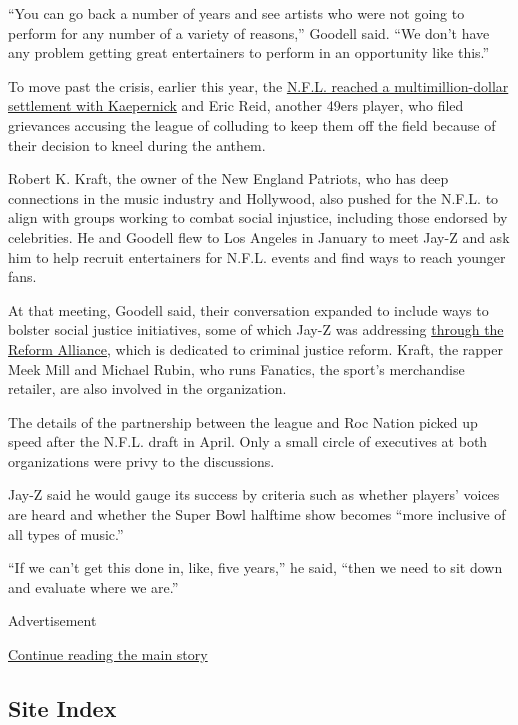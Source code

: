 ``You can go back a number of years and see artists who were not going
to perform for any number of a variety of reasons,'' Goodell said. ``We
don't have any problem getting great entertainers to perform in an
opportunity like this.''

To move past the crisis, earlier this year, the
\href{https://www.nytimes3xbfgragh.onion/2019/02/15/sports/nfl-colin-kaepernick.html}{N.F.L.
reached a multimillion-dollar settlement with Kaepernick} and Eric Reid,
another 49ers player, who filed grievances accusing the league of
colluding to keep them off the field because of their decision to kneel
during the anthem.

Robert K. Kraft, the owner of the New England Patriots, who has deep
connections in the music industry and Hollywood, also pushed for the
N.F.L. to align with groups working to combat social injustice,
including those endorsed by celebrities. He and Goodell flew to Los
Angeles in January to meet Jay-Z and ask him to help recruit
entertainers for N.F.L. events and find ways to reach younger fans.

At that meeting, Goodell said, their conversation expanded to include
ways to bolster social justice initiatives, some of which Jay-Z was
addressing \href{https://reformalliance.com/}{through the Reform
Alliance}, which is dedicated to criminal justice reform. Kraft, the
rapper Meek Mill and Michael Rubin, who runs Fanatics, the sport's
merchandise retailer, are also involved in the organization.

The details of the partnership between the league and Roc Nation picked
up speed after the N.F.L. draft in April. Only a small circle of
executives at both organizations were privy to the discussions.

Jay-Z said he would gauge its success by criteria such as whether
players' voices are heard and whether the Super Bowl halftime show
becomes ``more inclusive of all types of music.''

``If we can't get this done in, like, five years,'' he said, ``then we
need to sit down and evaluate where we are.''

Advertisement

\protect\hyperlink{after-bottom}{Continue reading the main story}

\hypertarget{site-index}{%
\subsection{Site Index}\label{site-index}}

